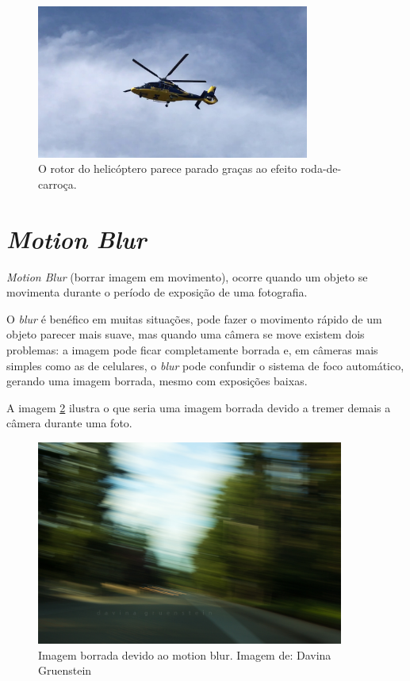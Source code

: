 \begin{figure}[H]
    \centering
    \includegraphics[width=0.8\textwidth,angle=0]{figures/helicoptero_parado.jpg}
    \caption{O rotor do helicóptero parece parado graças ao efeito roda-de-carroça.}
    \label{fig:helicopter}
\end{figure}
\pagebreak

\section{\textit{Motion Blur}}

\textit{Motion Blur} (borrar imagem em movimento), ocorre quando um objeto se movimenta durante o período de exposição de uma fotografia. 

O \textit{blur} é benéfico em muitas situações, pode fazer o movimento rápido de um objeto parecer mais suave, mas quando uma câmera se move existem dois problemas: a imagem pode ficar completamente borrada e, em câmeras mais simples como as de celulares, o \textit{blur} pode confundir o sistema de foco automático, gerando uma imagem borrada, mesmo com exposições baixas. 

A imagem \ref{fig:blur} ilustra o que seria uma imagem borrada devido a tremer demais a câmera durante uma foto.

\begin{figure}[H]
    \centering
    \includegraphics[width=0.9\textwidth,angle=0]{figures/motion-blur3.jpg}
    \caption{Imagem borrada devido ao motion blur. Imagem de: Davina Gruenstein}
    \label{fig:blur}
\end{figure}